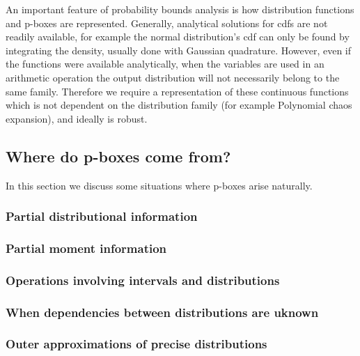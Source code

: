 \documentclass{juliacon}
\begin{document}
An important feature of probability bounds analysis is how distribution functions and p-boxes are represented. Generally, analytical solutions for cdfs are not readily available, for example the normal distribution's cdf can only be found by integrating the density, usually done with Gaussian quadrature. However, even if the functions were available analytically, when the variables are used in an arithmetic operation the output distribution will not necessarily belong to the same family. Therefore we require a representation of these continuous functions which is not dependent on the distribution family (for example Polynomial chaos expansion), and ideally is robust.



\subsection{Where do p-boxes come from?}

In this section we discuss some situations where p-boxes arise naturally.


\subsubsection{Partial distributional information} %



\subsubsection{Partial moment information} %
\label{section:Moments}


\subsubsection{Operations involving intervals and distributions} %

\subsubsection{When dependencies between distributions are uknown} %

\subsubsection{Outer approximations of precise distributions} %
\end{document}
